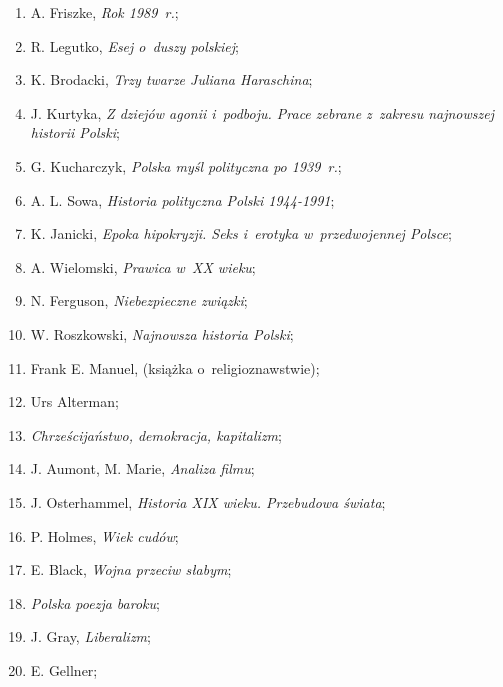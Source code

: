 \documentclass[a4paper,11pt]{article}
\begin{document}
\begin{enumerate}
\item A. Friszke, \textit{Rok 1989~r.};

\item R. Legutko, \textit{Esej o~duszy polskiej};

\item K. Brodacki, \textit{Trzy twarze Juliana Haraschina};

\item J. Kurtyka, \textit{Z dziejów agonii i~podboju. Prace zebrane
    z~zakresu najnowszej historii Polski};

\item G. Kucharczyk, \textit{Polska myśl polityczna po 1939~r.};

\item A. L. Sowa, \textit{Historia polityczna Polski 1944-1991};

\item K. Janicki, \textit{Epoka hipokryzji. Seks i~erotyka
    w~przedwojennej Polsce};

\item A. Wielomski, \textit{Prawica w~XX wieku};

\item N. Ferguson, \textit{Niebezpieczne związki};

\item W. Roszkowski, \textit{Najnowsza historia Polski};

\item Frank E. Manuel, (książka o~religioznawstwie);

\item Urs Alterman;

\item \textit{Chrześcijaństwo, demokracja, kapitalizm};

\item J. Aumont, M. Marie, \textit{Analiza filmu};

\item J. Osterhammel, \textit{Historia XIX wieku. Przebudowa świata};

\item P. Holmes, \textit{Wiek cudów};

\item E. Black, \textit{Wojna przeciw słabym};

\item \textit{Polska poezja baroku};

\item J. Gray, \textit{Liberalizm};

\item E. Gellner;


\end{enumerate}
\end{document}
